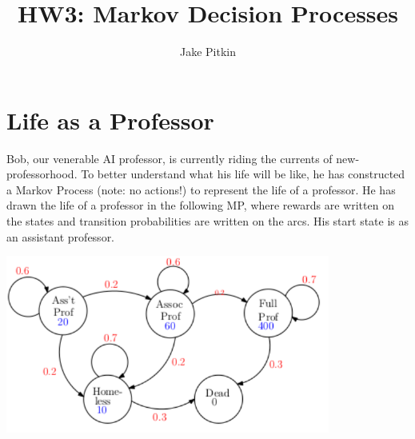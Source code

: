 \documentclass[fleqn]{hw}
\title{HW3: Markov Decision Processes}
\institute{University of Utah}
\author{Jake Pitkin}
\begin{document}
\maketitle



\section{Life as a Professor}

Bob, our venerable AI professor, is currently riding the currents of
new-professorhood.  To better understand what his life will be like,
he has constructed a Markov Process (note: no actions!) to represent the life of a professor.
He has drawn the life of a professor in the following MP, where rewards are written on the states
and transition probabilities are written on the arcs.  His start state
is as an assistant professor.

\begin{centering}
\includegraphics[width=0.8\textwidth]{academic-life.pdf}  
\end{centering}
\end{document}
